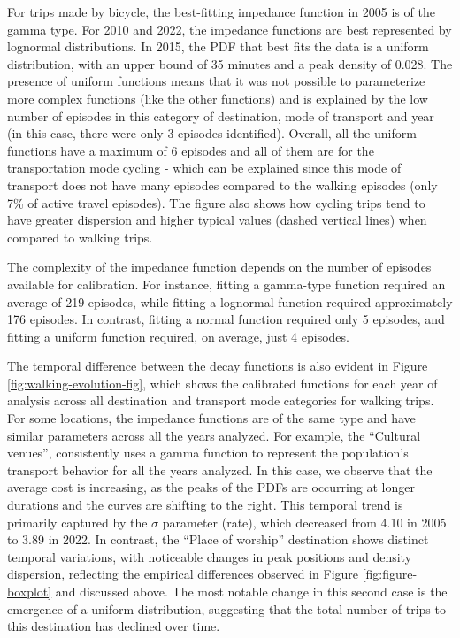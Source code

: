 \documentclass[preprint, 3p,
authoryear]{elsarticle} %
\begin{document}
For trips made by bicycle, the best-fitting impedance function in 2005
is of the gamma type. For 2010 and 2022, the impedance functions are
best represented by lognormal distributions. In 2015, the PDF that best
fits the data is a uniform distribution, with an upper bound of 35
minutes and a peak density of 0.028. The presence of uniform functions
means that it was not possible to parameterize more complex functions
(like the other functions) and is explained by the low number of
episodes in this category of destination, mode of transport and year (in
this case, there were only 3 episodes identified). Overall, all the
uniform functions have a maximum of 6 episodes and all of them are for
the transportation mode cycling - which can be explained since this mode
of transport does not have many episodes compared to the walking
episodes (only 7\% of active travel episodes). The figure also shows how
cycling trips tend to have greater dispersion and higher typical values
(dashed vertical lines) when compared to walking trips.

The complexity of the impedance function depends on the number of
episodes available for calibration. For instance, fitting a gamma-type
function required an average of 219 episodes, while fitting a lognormal
function required approximately 176 episodes. In contrast, fitting a
normal function required only 5 episodes, and fitting a uniform function
required, on average, just 4 episodes.

The temporal difference between the decay functions is also evident in
Figure \ref{fig:walking-evolution-fig}, which shows the calibrated
functions for each year of analysis across all destination and transport
mode categories for walking trips. For some locations, the impedance
functions are of the same type and have similar parameters across all
the years analyzed. For example, the ``Cultural venues'', consistently
uses a gamma function to represent the population's transport behavior
for all the years analyzed. In this case, we observe that the average
cost is increasing, as the peaks of the PDFs are occurring at longer
durations and the curves are shifting to the right. This temporal trend
is primarily captured by the \(\sigma\) parameter (rate), which
decreased from 4.10 in 2005 to 3.89 in 2022. In contrast, the ``Place of
worship'' destination shows distinct temporal variations, with
noticeable changes in peak positions and density dispersion, reflecting
the empirical differences observed in Figure \ref{fig:figure-boxplot}
and discussed above. The most notable change in this second case is the
emergence of a uniform distribution, suggesting that the total number of
trips to this destination has declined over time.
\end{document}
